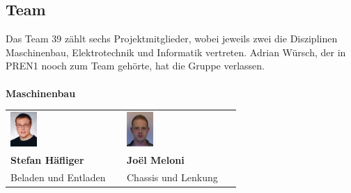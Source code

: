 \subsection{Team}
Das Team 39 zählt sechs Projektmitglieder, wobei jeweils zwei die Disziplinen Maschinenbau, Elektrotechnik und Informatik vertreten. Adrian Würsch, der in PREN1 nooch zum Team gehörte, hat die Gruppe verlassen. \\\\
\large
\textbf{Maschinenbau}
\begin{table}[H]
\begin{tabular}{p{}p{}}	
	\includegraphics[width=0.25\textwidth]{./04_Projektmanagement/fig/stefanhaefliger.jpg}	&		\includegraphics[width=0.25\textwidth]{./04_Projektmanagement/fig/joelmeloni.jpg} 
	\\
	\textbf{Stefan Häfliger} & 	
	\textbf{Joël Meloni}
	\\
	Beladen und Entladen &
	Chassis und Lenkung
\end{tabular}
\end{table}

